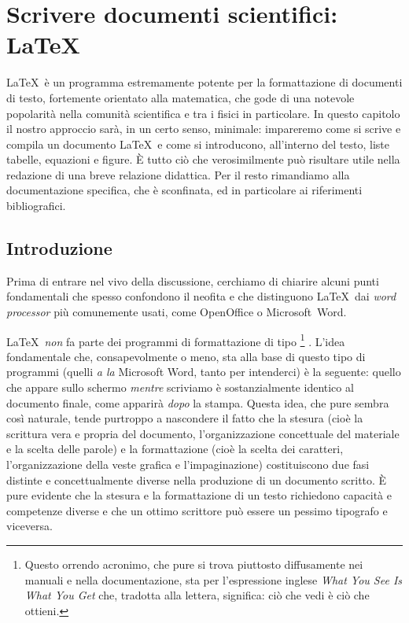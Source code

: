 \chapter{Scrivere documenti scientifici: \LaTeX}
\label{chap:LaTeX}
\mt

\LaTeX\ \`e un programma estremamente potente per la formattazione di
documenti di testo, fortemente orientato alla matematica, che gode di
una notevole popolarit\`a nella comunit\`a scientifica e tra i fisici in
particolare.
In questo capitolo il nostro approccio sar\`a, in un certo senso, minimale:
impareremo come si scrive e compila un documento \LaTeX\ e come si introducono,
all'interno del testo, liste tabelle, equazioni e figure. \`E tutto ci\`o che
verosimilmente pu\`o risultare utile nella redazione di una breve relazione
didattica. Per il resto rimandiamo alla documentazione specifica, che \`e
sconfinata, ed in particolare ai riferimenti bibliografici.


\section{Introduzione}

Prima di entrare nel vivo della discussione, cerchiamo di chiarire alcuni
punti fondamentali che spesso confondono il neofita e che distinguono
\LaTeX\ dai \emph{word processor} pi\`u comunemente usati, come
OpenOffice o Microsoft~Word.

\LaTeX\ \emph{non} fa parte dei programmi di formattazione di tipo \wysiwyg%
\footnote{
Questo orrendo acronimo, che pure si trova piuttosto diffusamente nei manuali
e nella documentazione, sta per l'espressione inglese \emph{What You See Is
What You Get} che, tradotta alla lettera, significa: ci\`o che vedi \`e ci\`o
che ottieni.}%
. L'idea fondamentale che, consapevolmente o meno, sta alla base di questo tipo
di programmi (quelli \emph{a la} Microsoft Word, tanto per intenderci) \`e la
seguente: quello che appare sullo schermo \emph{mentre} scriviamo \`e
sostanzialmente identico al documento finale, come apparir\`a \emph{dopo}
la stampa. Questa idea, che pure sembra cos\`i naturale, tende purtroppo a
nascondere il fatto che la stesura (cio\`e la scrittura vera e propria del
documento, l'organizzazione concettuale del materiale e la scelta delle parole)
e la formattazione (cio\`e la scelta dei caratteri, l'organizzazione della
veste grafica e l'impaginazione) costituiscono due fasi distinte e
concettualmente diverse nella produzione di un documento scritto.
\`E pure evidente che la stesura e la formattazione di un testo richiedono
capacit\`a e competenze diverse e che un ottimo scrittore pu\`o essere un
pessimo tipografo e viceversa.

